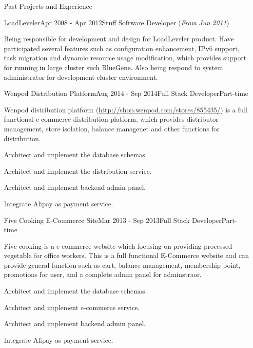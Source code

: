 \documentclass{resume} %
\newcommand{\http}{http:/\hspace{-0.3ex}/}
\begin{document}
\begin{rSection}{Past Projects and Experience}
\begin{rSubsection}{LoadLeveler}{Apr 2008 - Apr 2012}{Stuff Software Developer (\textit{From Jun 2011})}{}

Being responsible for development and design for LoadLeveler product. Have participated several features such as configuration enhancement, IPv6 support, task migration and dynamic resource usage modification, which provides support for running in large cluster such BlueGene. Also being respond to system administrator for development cluster environment.

\end{rSubsection}



\begin{rSubsection}{Wenpod Distribution Platform}{Aug 2014 - Sep 2014}{Full Stack Developer}{Part-time}

Wenpod distribution platform (\href{http://shop.wenpod.com/stores/855435/}{\http{}shop.wenpod.com/stores/855435/}) is a full functional e-commerce distribution platform, which provides distributor management, store isolation, balance managenet and other functions for distribution.

\begin{rSubsectionList}
\item Architect and implement the database schemas.
\item Architect and implement the distribution service.
\item Architect and implement backend admin panel.
\item Integrate Alipay as payment service.
\end{rSubsectionList}
\end{rSubsection}



\begin{rSubsection}{Five Cooking E-Commerce Site}{Mar 2013 - Sep 2013}{Full Stack Developer}{Part-time}

Five cooking is a e-commerce website which focusing on providing processed vegetable for office workers. This is a full functional E-Commerce website and can provide general function such as cart, balance management, membership point, promotions for user, and a complete admin panel for adminstraor.

\begin{rSubsectionList}
\item Architect and implement the database schemas.
\item Architect and implement e-commerce service.
\item Architect and implement backend admin panel.
\item Integrate Alipay as payment service.
\end{rSubsectionList}
\end{rSubsection}



\end{rSection}
\end{document}

